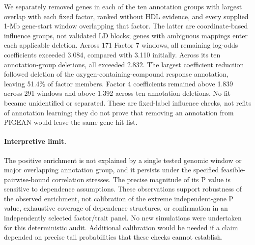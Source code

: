 We separately removed genes in each of the ten annotation groups with largest overlap with each fixed factor, ranked without HDL evidence, and every supplied 1-Mb gene-start window overlapping that factor. The latter are coordinate-based influence groups, not validated LD blocks; genes with ambiguous mappings enter each applicable deletion. Across 171 Factor 7 windows, all remaining log-odds coefficients exceeded 3.084, compared with 3.110 initially. Across its ten annotation-group deletions, all exceeded 2.832. The largest coefficient reduction followed deletion of the oxygen-containing-compound response annotation, leaving 51.4\% of factor members. Factor 4 coefficients remained above 1.839 across 291 windows and above 1.392 across ten annotation deletions. No fit became unidentified or separated. These are fixed-label influence checks, not refits of annotation learning; they do not prove that removing an annotation from PIGEAN would leave the same gene-hit list.

\paragraph{Interpretive limit.}
The positive enrichment is not explained by a single tested genomic window or major overlapping annotation group, and it persists under the specified feasible-pairwise-bound correlation stresses. The precise magnitude of its P value is sensitive to dependence assumptions. These observations support robustness of the observed enrichment, not calibration of the extreme independent-gene P value, exhaustive coverage of dependence structures, or confirmation in an independently selected factor/trait panel. No new simulations were undertaken for this deterministic audit. Additional calibration would be needed if a claim depended on precise tail probabilities that these checks cannot establish.
